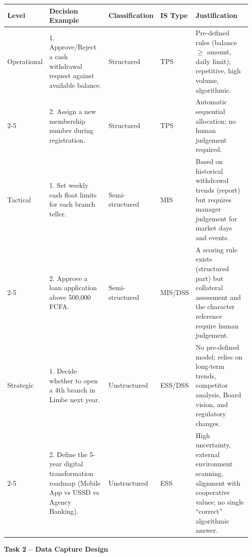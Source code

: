 \documentclass[11pt]{article}
\begin{document}
\begin{center}
\begin{tabularx}{\linewidth}{|l|X|X|l|X|}
\hline
\rowcolor{popblueL}
\textbf{Level} & \textbf{Decision Example} & \textbf{Classification} & \textbf{IS Type} & \textbf{Justification} \\
\hline
Operational & 1. Approve/Reject a cash withdrawal request against available balance. & Structured & TPS & Pre-defined rules (balance $\ge$ amount, daily limit); repetitive, high volume, algorithmic. \\
\cline{2-5}
 & 2. Assign a new membership number during registration. & Structured & TPS & Automatic sequential allocation; no human judgement required. \\
\hline
Tactical & 1. Set weekly cash float limits for each branch teller. & Semi-structured & MIS & Based on historical withdrawal trends (report) but requires manager judgement for market days and events. \\
\cline{2-5}
 & 2. Approve a loan application above 500,000 FCFA. & Semi-structured & MIS/DSS & A scoring rule exists (structured part) but collateral assessment and the character reference require human judgement. \\
\hline
Strategic & 1. Decide whether to open a 4th branch in Limbe next year. & Unstructured & ESS/DSS & No pre-defined model; relies on long-term trends, competitor analysis, Board vision, and regulatory changes. \\
\cline{2-5}
 & 2. Define the 5-year digital transformation roadmap (Mobile App vs USSD vs Agency Banking). & Unstructured & ESS & High uncertainty, external environment scanning, alignment with cooperative values; no single ``correct'' algorithmic answer. \\
\hline
\end{tabularx}
\end{center}

\medskip
\noindent\textbf{Task 2 -- Data Capture Design}
\end{document}
